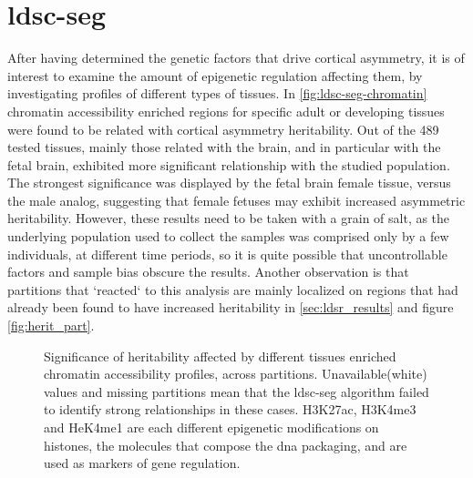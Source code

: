 \section{\acs{ldsc-seg}}
\label{sec:ldsc-seg}
After having determined the genetic factors that drive cortical asymmetry, it is of interest to examine the amount of epigenetic regulation affecting them, by investigating profiles of different types of tissues. In \autoref{fig:ldsc-seg-chromatin} chromatin accessibility enriched regions for specific adult or developing tissues were found to be related with cortical asymmetry heritability. Out of the 489 tested tissues, mainly those related with the brain, and in particular with the fetal brain, exhibited more significant relationship with the studied population. The strongest significance was displayed by the fetal brain female tissue, versus the male analog, suggesting that female fetuses may exhibit increased asymmetric heritability. However, these results need to be taken with a grain of salt, as the underlying population used to collect the samples was comprised only by a few individuals, at different time periods, so it is quite possible that uncontrollable factors and sample bias obscure the results. Another observation is that partitions that `reacted` to this analysis are mainly localized on regions that had already been found to have increased heritability in \autoref{sec:ldsr_results} and figure \autoref{fig:herit_part}.


\begin{figure}[H]
	\begin{adjustwidth}{-3cm}{-3cm}
	\centering
	
	\caption[LDSC-SEG assessment on variable chromatin accessibility]{Significance of heritability affected by different tissues enriched chromatin accessibility profiles, across partitions. Unavailable(white) values and missing partitions mean that the \ac{ldsc-seg} algorithm failed to identify strong relationships in these cases. H3K27ac, H3K4me3 and HeK4me1 are each different epigenetic modifications on histones, the molecules that compose the \ac{dna} packaging, and are used as markers of gene regulation.}
	\label{fig:ldsc-seg-chromatin}
	\end{adjustwidth}
\end{figure}

